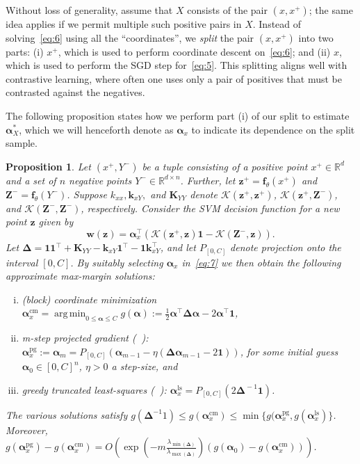 \documentclass[letterpaper]{article} \usepackage{aaai22}  \usepackage{times}  \usepackage{helvet}  \usepackage{courier}  \usepackage[hyphens]{url}  \usepackage{graphicx} \urlstyle{rm} \def\UrlFont{\rm}  \usepackage{natbib}  \usepackage{caption} \DeclareCaptionStyle{ruled}{labelfont=normalfont,labelsep=colon,strut=off} \frenchspacing  \setlength{\pdfpagewidth}{8.5in}  \setlength{\pdfpageheight}{11in}
\newcommand{\vx}{x}\newcommand{\px}{x^+}\newcommand{\nx}{x^{-}} \newcommand{\vz}{\bm{z}}
\newcommand{\pz}{\bm{z}^+}
\newcommand{\vw}{\bm{w}}
\newcommand{\valpha}{\bm{\alpha}}
\newcommand{\one}{\bm{1}}
\newcommand{\tone}{\bm{1}^{\!\top}}
\newcommand{\kxx}{k_{xx}}
\newcommand{\kxy}{\bm{k}_{xY}}
\newcommand{\Kyy}{\bm{K}_{YY}}
\newcommand{\mDel}{\bm{\Delta}}
\newcommand{\nY}{Y^{-}}\newcommand{\mK}{\bm{K}}
\newcommand{\nmZ}{{\bm{Z}}^{-}}
\newcommand{\kernel}{\mathcal{K}}
\newcommand{\half}{\tfrac{1}{2}}
\newcommand{\ft}{\bm{f}_\theta}
\newcommand{\inv}[1]{{#1}^{\!-\!1}}
\newcommand{\reals}[1]{\mathbb{R}^{#1}}
\DeclareMathOperator*{\INVMMCL}{MMCL_{INV}}
\DeclareMathOperator*{\PGDMMCL}{MMCL_{PGD}}
\DeclareMathOperator*{\argmin}{arg\,min}
\newtheorem{prop}{Proposition}\newtheorem{lemma}{Lemma}
\begin{document}
Without loss of generality, assume that $X$ consists of the pair $(\vx,\px)$; the same idea applies if we permit multiple such positive pairs in $X$. Instead of solving~\eqref{eq:6} using all the ``coordinates'', we \emph{split} the pair $(\vx,\px)$ into two parts: (i) $\px$, which is used to perform coordinate descent on~\eqref{eq:6}; and (ii) $\vx$, which is used to perform the SGD step for~\eqref{eq:5}. This splitting aligns well with contrastive learning, where often one uses only a pair of positives that must be contrasted against the negatives. 

The following proposition states how we perform part (i) of our split to estimate $\valpha_X^*$, which we will henceforth denote as $\valpha_{\vx}$ to indicate its dependence on the split sample. 

\begin{prop}
  \label{prop:npt}
  Let $(\px,\nY)$ be a tuple consisting of a positive point $\px\in\reals{d}$ and a set of $n$ negative points $\nY\in\reals{d\times n}$. Further, let $\pz=\ft(\px)$ and $\nmZ=\ft(\nY)$. Suppose $\kxx,\kxy,$ and $\Kyy$ denote $\kernel(\pz,\pz)$, $\kernel(\pz, \nmZ)$, and $\kernel(\nmZ, \nmZ)$, respectively. Consider the SVM decision function for a new point $\vz$ given by 
  \begin{equation}
    \label{eq:7}
    \vw(\vz) = \valpha_x^{\top}\left(\kernel(\pz, \vz)\one - \kernel(\nmZ, \vz)\right).
  \end{equation}
  Let $\mDel=\one\tone + \Kyy - \kxy\tone - \one\kxy^{\top}$, and let $P_{[0,C]}$ denote projection onto the interval $[0,C]$. By suitably selecting $\valpha_x$ in~\eqref{eq:7} we then obtain the following approximate max-margin solutions:
  \begin{enumerate}[(i)]
    \setlength{\itemsep}{0pt}
  \item (block) coordinate minimization  $\valpha_{\vx}^{\text{cm}}=\argmin_{0\le \valpha \le C} g(\valpha) := \half\valpha^{\top}\mDel\valpha -2\valpha^{\top}\one$,
  \item m-step projected gradient ($\PGDMMCL$): $\valpha_{\vx}^{\text{pg}} := \valpha_{m}= P_{[0,C]}(\valpha_{m-1}-\eta(\mDel\valpha_{m-1}-2\one))$, for some initial guess $\valpha_0\in [0,C]^n$, $\eta>0$ a step-size, and 
  \item greedy truncated least-squares ($\INVMMCL$): $\valpha_{\vx}^{\text{ls}}=P_{[0,C]}(2\inv{\mDel}\one)$.
  \end{enumerate}
  The various solutions satisfy $g(\mDel^{-1}1) \le g(\valpha_{\vx}^{\text{cm}}) \le \min\{g(\valpha_{\vx}^{\text{pg}}, g(\valpha_{\vx}^{\text{ls}})\}$. Moreover, $g(\valpha_{\vx}^{\text{pg}})-g(\valpha_{\vx}^{\text{cm}})=O\left(\exp\left(-m\frac{\lambda_{\min(\mDel)}}{\lambda_{\max(\mDel)}}\right)(g(\valpha_0)-g(\valpha_{\vx}^{\text{cm}}))\right)$.
\end{prop}
\end{document}
